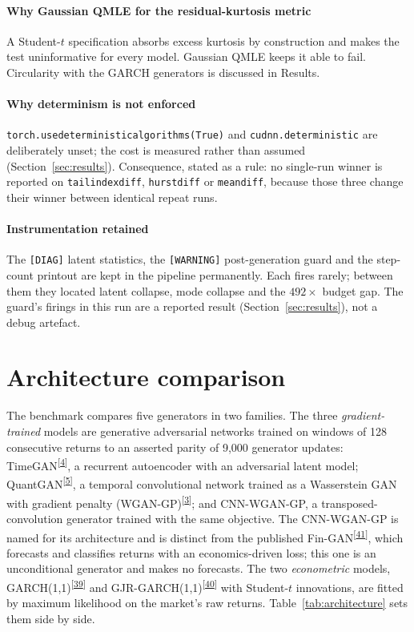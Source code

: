 \documentclass[11pt,a4paper]{article}
\makeatletter
\newcommand{\tcite}[1]{\textsuperscript{[\hyperlink{R:#1}{#1}]}}
\DeclareRobustCommand{\_}{\ifmmode\nfss@text{\textunderscore}\else\textunderscore\allowbreak\fi}
\makeatother
\begin{document}
\paragraph{Why Gaussian QMLE for the residual-kurtosis metric} A Student-$t$ specification absorbs excess kurtosis by construction and makes the test uninformative for every model. Gaussian QMLE keeps it able to fail. Circularity with the GARCH generators is discussed in Results.

\paragraph{Why determinism is not enforced} \texttt{torch.use\_deterministic\_algorithms(True)} and \texttt{cudnn.deterministic} are deliberately unset; the cost is measured rather than assumed (Section~\ref{sec:results}). Consequence, stated as a rule: no single-run winner is reported on \texttt{tail\_index\_diff}, \texttt{hurst\_diff} or \texttt{mean\_diff}, because those three change their winner between identical repeat runs.

\paragraph{Instrumentation retained} The \texttt{[DIAG]} latent statistics, the \texttt{[WARNING]} post-generation guard and the step-count printout are kept in the pipeline permanently. Each fires rarely; between them they located latent collapse, mode collapse and the $492\times$ budget gap. The guard's firings in this run are a reported result (Section~\ref{sec:results}), not a debug artefact.
\section{Architecture comparison}
\label{sec:architecture}
The benchmark compares five generators in two families. The three \emph{gradient-trained} models are generative adversarial networks trained on windows of 128 consecutive returns to an asserted parity of 9,000 generator updates: TimeGAN\tcite{4}, a recurrent autoencoder with an adversarial latent model; QuantGAN\tcite{5}, a temporal convolutional network trained as a Wasserstein GAN with gradient penalty (WGAN-GP)\tcite{3}; and CNN-WGAN-GP, a transposed-convolution generator trained with the same objective. The CNN-WGAN-GP is named for its architecture and is distinct from the published Fin-GAN\tcite{41}, which forecasts and classifies returns with an economics-driven loss; this one is an unconditional generator and makes no forecasts. The two \emph{econometric} models, GARCH(1,1)\tcite{39} and GJR-GARCH(1,1)\tcite{40} with Student-$t$ innovations, are fitted by maximum likelihood on the market's raw returns. Table~\ref{tab:architecture} sets them side by side.
\end{document}

